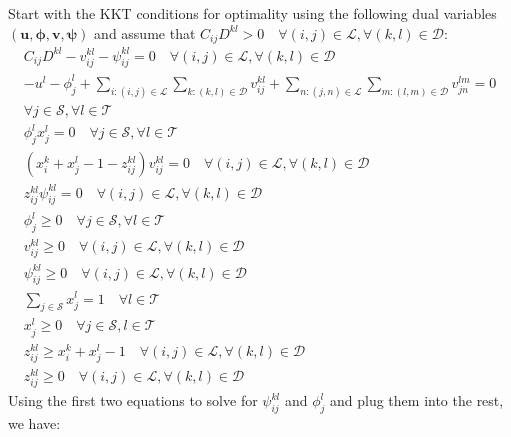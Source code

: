 Start with the KKT conditions for optimality using the following dual variables $(\mathbf{u},\boldsymbol{\phi},\mathbf{v},\boldsymbol{\psi})$ and assume that $C_{ij}D^{kl}>0\quad\forall (i,j)\in\mathcal{L}, \forall(k,l)\in\mathcal{D}$:
\begin{subequations}\label{eq:opt_stage_lin1_kkt1}
	\begin{align}
		C_{ij}D^{kl}-v_{ij}^{kl}-\psi_{ij}^{kl} =0 \quad \forall (i,j)\in\mathcal{L}, \forall(k,l)\in\mathcal{D} \label{eq:opt_stage_lin1_kkt1_stat1} \\
		-u^l-\phi_j^l+\sum_{i:(i,j)\in\mathcal{L}}\sum_{k:(k,l)\in\mathcal{D}}v_{ij}^{kl}+\sum_{n:(j,n)\in\mathcal{L}}\sum_{m:(l,m)\in\mathcal{D}}v_{jn}^{lm} =0 \nonumber\\
		\forall j\in\mathcal{S},\forall l\in\mathcal{T} \label{eq:opt_stage_lin1_kkt1_stat2} \\
		\phi_j^lx_j^l = 0 \quad \forall j\in\mathcal{S},\forall l\in\mathcal{T} \label{eq:opt_stage_lin1_kkt1_cs1} \\
		(x_i^k+x_j^l-1-z_{ij}^{kl})v_{ij}^{kl} = 0 \quad \forall (i,j)\in\mathcal{L}, \forall(k,l)\in\mathcal{D} \label{eq:opt_stage_lin1_kkt1_cs2} \\
		z_{ij}^{kl}\psi_{ij}^{kl} = 0 \quad \forall (i,j)\in\mathcal{L}, \forall(k,l)\in\mathcal{D} \label{eq:opt_stage_lin1_kkt1_cs3} \\
		\phi_j^l \geq 0  \quad \forall j\in\mathcal{S},\forall l\in\mathcal{T} \label{eq:opt_stage_lin1_kkt1_dual1} \\
		v_{ij}^{kl} \geq 0 \quad \forall (i,j)\in\mathcal{L}, \forall(k,l)\in\mathcal{D} \label{eq:opt_stage_lin1_kkt1_dual2} \\
		\psi_{ij}^{kl} \geq 0 \quad \forall (i,j)\in\mathcal{L}, \forall(k,l)\in\mathcal{D} \label{eq:opt_stage_lin1_kkt1_dual3} \\
		\sum_{j\in\mathcal{S}}x_j^l = 1 \quad \forall l\in\mathcal{T} \label{eq:opt_stage_lin1_kkt1_prim1} \\
		x_j^l \geq 0 \quad \forall j\in\mathcal{S},l\in\mathcal{T} \label{eq:opt_stage_lin1_kkt1_prim2} \\
		z_{ij}^{kl} \geq x_i^k+x_j^l-1 \quad \forall (i,j)\in\mathcal{L}, \forall(k,l)\in\mathcal{D} \label{eq:opt_stage_lin1_kkt1_prim3} \\
		z_{ij}^{kl} \geq 0 \quad \forall (i,j)\in\mathcal{L}, \forall(k,l)\in\mathcal{D} \label{eq:opt_stage_lin1_kkt1_prim4}
	\end{align}
\end{subequations}
Using the first two equations to solve for $\psi_{ij}^{kl}$ and $\phi_j^l$ and plug them into the rest, we have:
